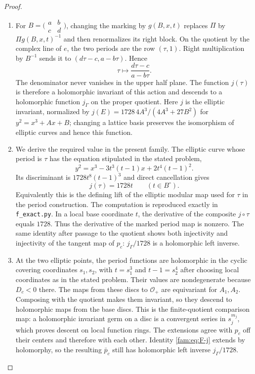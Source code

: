 \begin{proof}
\begin{enumerate}[label=\arabic*.,leftmargin=*]
\item For $B=\bigl(\begin{smallmatrix}a&b\\c&d\end{smallmatrix}\bigr)$, changing
the marking by $g(B,x,t)$ replaces $\Pi$ by $\Pi g(B,x,t)^{-1}$ and then
renormalizes its right block.  On the quotient by the complex line of
$e$, the two periods are the row $(\tau,1)$.  Right multiplication by
$B^{-1}$ sends it to $(d\tau-c,a-b\tau)$.  Hence
\begin{equation}\label{fam:eq:F-tauaction}
 \tau\longmapsto\frac{d\tau-c}{a-b\tau}.
\end{equation}
The denominator never vanishes in the upper half plane.  The function
$j(\tau)$ is therefore a holomorphic invariant of this action and
descends to a holomorphic function $j_\Gamma$ on the proper quotient.
Here $j$ is the elliptic invariant, normalized by
$j(E)=1728\,4A^3/(4A^3+27B^2)$ for $y^2=x^3+Ax+B$; changing a lattice
basis preserves the isomorphism of elliptic curves and hence this
function.

\item We derive the required value in the present family.  The elliptic curve
whose period is $\tau$ has the equation stipulated in the stated problem,
\[
 y^2=x^3-3t^3(t-1)x+2t^4(t-1)^2.
\]
Its discriminant is $1728t^8(t-1)^3$ and direct cancellation gives
\begin{equation}\label{fam:eq:F-j}
 j(\tau)=1728t\qquad(t\in B^\circ).
\end{equation}
Equivalently this is the defining lift of the elliptic modular map used
for $\tau$ in the period construction.  The computation is reproduced
exactly in \texttt{f\_exact.py}.  In a local base coordinate $t$, the
derivative of the composite $j\circ\tau$ equals $1728$.  Thus the
derivative of the marked period map is nonzero.  The same identity after
passage to the quotient shows both injectivity and injectivity of the
tangent map of $p_c$: $j_\Gamma/1728$ is a holomorphic left inverse.

\item At the two elliptic points, the period functions are holomorphic in the
cyclic covering coordinates $s_1,s_2$, with $t=s_1^3$ and
$t-1=s_2^4$ after choosing local coordinates as in the stated problem.  Their
values are nondegenerate because $D_c<0$ there.  The maps from these
discs to $\mathcal O_+$ are equivariant for $A_1,A_2$.  Composing with
the quotient makes them invariant, so they descend to holomorphic maps
from the base discs.  This is the finite-quotient comparison map: a
holomorphic invariant germ on a disc is a convergent series in $s_j^{m_j}$,
which proves descent on local function rings.  The extensions agree
with $p_c$ off their centers and therefore with each other.  Identity
\eqref{fam:eq:F-j} extends by holomorphy, so the resulting $\bar p_c$ still
has holomorphic left inverse $j_\Gamma/1728$.


\end{enumerate}
\end{proof}
